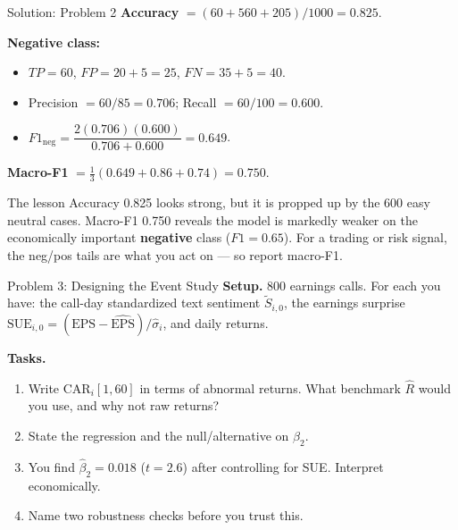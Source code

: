 \documentclass[9pt,t]{beamer}
\begin{document}
\begin{frame}{Solution: Problem 2}
\textbf{Accuracy} $=(60+560+205)/1000 = \mathbf{0.825}$.

\medskip
\textbf{Negative class:}
\begin{itemize}\small
  \item $TP=60$, $FP=20+5=25$, $FN=35+5=40$.
  \item Precision $=60/85 = 0.706$; \quad Recall $=60/100 = 0.600$.
  \item $F1_{\text{neg}} = \dfrac{2(0.706)(0.600)}{0.706+0.600} = \mathbf{0.649}$.
\end{itemize}

\medskip
\textbf{Macro-F1} $=\tfrac13(0.649+0.86+0.74) = \mathbf{0.750}$.

\medskip
\begin{alertblock}{The lesson}
Accuracy 0.825 looks strong, but it is propped up by the 600 easy neutral cases.
Macro-F1 0.750 reveals the model is markedly weaker on the economically important
\textbf{negative} class ($F1=0.65$). For a trading or risk signal, the
neg/pos tails are what you act on --- so report macro-F1.
\end{alertblock}
\end{frame}

\begin{frame}{Problem 3: Designing the Event Study}
\textbf{Setup.} 800 earnings calls. For each you have: the call-day standardized
text sentiment $\tilde S_{i,0}$, the earnings surprise
$\mathrm{SUE}_{i,0}=(\mathrm{EPS}-\widehat{\mathrm{EPS}})/\hat\sigma_i$, and daily returns.

\medskip
\textbf{Tasks.}
\begin{enumerate}
  \item Write $\mathrm{CAR}_i[1,60]$ in terms of abnormal returns. What benchmark
        $\hat R$ would you use, and why not raw returns?
  \item State the regression and the null/alternative on $\beta_2$.
  \item You find $\hat\beta_2 = 0.018$ ($t=2.6$) after controlling for SUE.
        Interpret economically.
  \item Name two robustness checks before you trust this.
\end{enumerate}
\end{frame}
\end{document}
